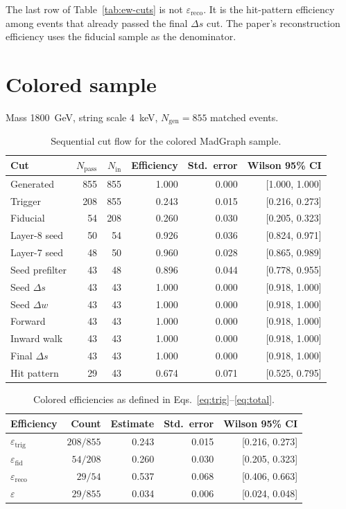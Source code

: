 \documentclass[11pt,a4paper]{article}
\begin{document}
The last row of Table~\ref{tab:ew-cuts} is not \(\varepsilon_{\mathrm{reco}}\).
It is the hit-pattern efficiency among events that already passed the final \(\Delta s\) cut.
The paper's reconstruction efficiency uses the fiducial sample as the denominator.

\section{Colored sample}
\label{sec:qcd}
Mass \SI{1800}{\GeV}, string scale \SI{4}{\keV}, \(N_{\mathrm{gen}} = 855\) matched events.

\begin{table}[H]
\centering
\caption{Sequential cut flow for the colored MadGraph sample.}
\label{tab:qcd-cuts}
\small
\begin{tabular}{lrrrrr}
\toprule
Cut & \(N_{\mathrm{pass}}\) & \(N_{\mathrm{in}}\) & Efficiency & Std.\ error & Wilson 95\% CI \\
\midrule
Generated & 855 & 855 & 1.000 & 0.000 & [1.000, 1.000] \\
Trigger & 208 & 855 & 0.243 & 0.015 & [0.216, 0.273] \\
Fiducial & 54 & 208 & 0.260 & 0.030 & [0.205, 0.323] \\
Layer-8 seed & 50 & 54 & 0.926 & 0.036 & [0.824, 0.971] \\
Layer-7 seed & 48 & 50 & 0.960 & 0.028 & [0.865, 0.989] \\
Seed prefilter & 43 & 48 & 0.896 & 0.044 & [0.778, 0.955] \\
Seed \(\Delta s\) & 43 & 43 & 1.000 & 0.000 & [0.918, 1.000] \\
Seed \(\Delta w\) & 43 & 43 & 1.000 & 0.000 & [0.918, 1.000] \\
Forward & 43 & 43 & 1.000 & 0.000 & [0.918, 1.000] \\
Inward walk & 43 & 43 & 1.000 & 0.000 & [0.918, 1.000] \\
Final \(\Delta s\) & 43 & 43 & 1.000 & 0.000 & [0.918, 1.000] \\
Hit pattern & 29 & 43 & 0.674 & 0.071 & [0.525, 0.795] \\
\bottomrule
\end{tabular}
\end{table}

\begin{table}[H]
\centering
\caption{Colored efficiencies as defined in Eqs.~\eqref{eq:trig}--\eqref{eq:total}.}
\label{tab:qcd-eff}
\begin{tabular}{lrrrr}
\toprule
Efficiency & Count & Estimate & Std.\ error & Wilson 95\% CI \\
\midrule
\(\varepsilon_{\mathrm{trig}}\) & $208/855$ & 0.243 & 0.015 & [0.216, 0.273] \\
\(\varepsilon_{\mathrm{fid}}\) & $54/208$ & 0.260 & 0.030 & [0.205, 0.323] \\
\(\varepsilon_{\mathrm{reco}}\) & $29/54$ & 0.537 & 0.068 & [0.406, 0.663] \\
\(\varepsilon\) & $29/855$ & 0.034 & 0.006 & [0.024, 0.048] \\
\bottomrule
\end{tabular}
\end{table}
\end{document}
